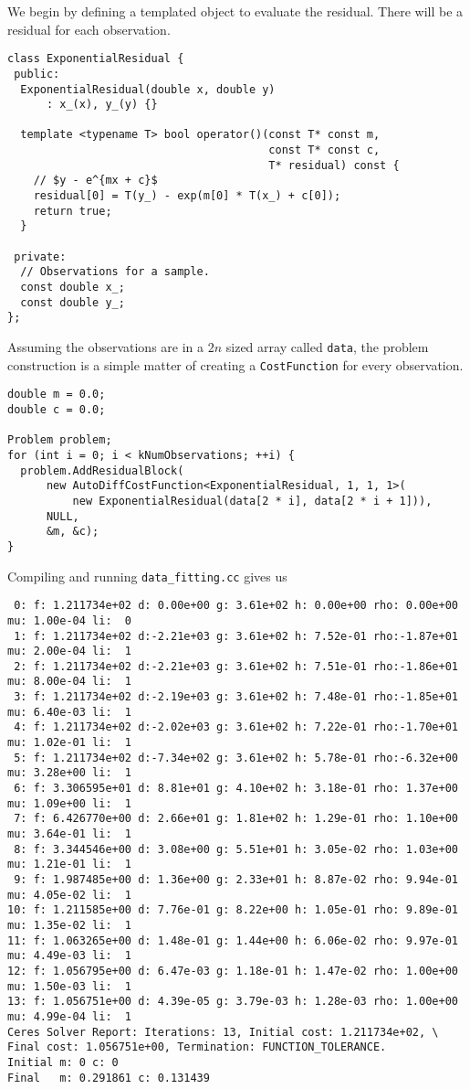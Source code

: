 We begin by defining a templated object to evaluate the residual. There will be a residual for each observation.
\begin{verbatim}
class ExponentialResidual {
 public:
  ExponentialResidual(double x, double y)
      : x_(x), y_(y) {}

  template <typename T> bool operator()(const T* const m,
                                        const T* const c,
                                        T* residual) const {
    // $y - e^{mx + c}$
    residual[0] = T(y_) - exp(m[0] * T(x_) + c[0]);  
    return true;
  }

 private:
  // Observations for a sample.
  const double x_;
  const double y_;
};
\end{verbatim}
Assuming the observations are in a $2n$ sized array called \texttt{data}, the problem construction is a simple matter of creating a \texttt{CostFunction} for every observation.
\clearpage
\begin{verbatim}
double m = 0.0;
double c = 0.0;

Problem problem;
for (int i = 0; i < kNumObservations; ++i) {
  problem.AddResidualBlock(
      new AutoDiffCostFunction<ExponentialResidual, 1, 1, 1>(
          new ExponentialResidual(data[2 * i], data[2 * i + 1])),
      NULL,
      &m, &c);
}
\end{verbatim}
Compiling and running \texttt{data\_fitting.cc} gives us
\begin{verbatim}
 0: f: 1.211734e+02 d: 0.00e+00 g: 3.61e+02 h: 0.00e+00 rho: 0.00e+00 mu: 1.00e-04 li:  0
 1: f: 1.211734e+02 d:-2.21e+03 g: 3.61e+02 h: 7.52e-01 rho:-1.87e+01 mu: 2.00e-04 li:  1
 2: f: 1.211734e+02 d:-2.21e+03 g: 3.61e+02 h: 7.51e-01 rho:-1.86e+01 mu: 8.00e-04 li:  1
 3: f: 1.211734e+02 d:-2.19e+03 g: 3.61e+02 h: 7.48e-01 rho:-1.85e+01 mu: 6.40e-03 li:  1
 4: f: 1.211734e+02 d:-2.02e+03 g: 3.61e+02 h: 7.22e-01 rho:-1.70e+01 mu: 1.02e-01 li:  1
 5: f: 1.211734e+02 d:-7.34e+02 g: 3.61e+02 h: 5.78e-01 rho:-6.32e+00 mu: 3.28e+00 li:  1
 6: f: 3.306595e+01 d: 8.81e+01 g: 4.10e+02 h: 3.18e-01 rho: 1.37e+00 mu: 1.09e+00 li:  1
 7: f: 6.426770e+00 d: 2.66e+01 g: 1.81e+02 h: 1.29e-01 rho: 1.10e+00 mu: 3.64e-01 li:  1
 8: f: 3.344546e+00 d: 3.08e+00 g: 5.51e+01 h: 3.05e-02 rho: 1.03e+00 mu: 1.21e-01 li:  1
 9: f: 1.987485e+00 d: 1.36e+00 g: 2.33e+01 h: 8.87e-02 rho: 9.94e-01 mu: 4.05e-02 li:  1
10: f: 1.211585e+00 d: 7.76e-01 g: 8.22e+00 h: 1.05e-01 rho: 9.89e-01 mu: 1.35e-02 li:  1
11: f: 1.063265e+00 d: 1.48e-01 g: 1.44e+00 h: 6.06e-02 rho: 9.97e-01 mu: 4.49e-03 li:  1
12: f: 1.056795e+00 d: 6.47e-03 g: 1.18e-01 h: 1.47e-02 rho: 1.00e+00 mu: 1.50e-03 li:  1
13: f: 1.056751e+00 d: 4.39e-05 g: 3.79e-03 h: 1.28e-03 rho: 1.00e+00 mu: 4.99e-04 li:  1
Ceres Solver Report: Iterations: 13, Initial cost: 1.211734e+02, \
Final cost: 1.056751e+00, Termination: FUNCTION_TOLERANCE.
Initial m: 0 c: 0
Final   m: 0.291861 c: 0.131439
\end{verbatim}

